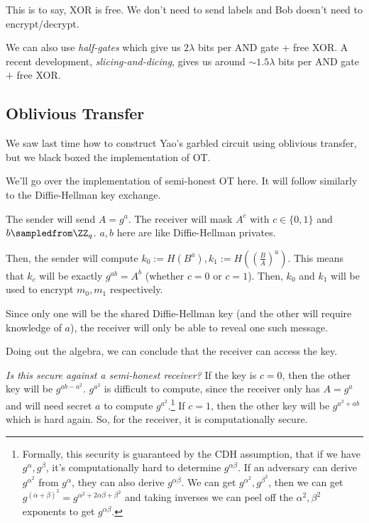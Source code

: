 This is to say, \textsf{XOR} is free. We don't need to send labels and Bob doesn't need to encrypt/decrypt.


We can also use \emph{half-gates} which give us $2\lambda$ bits per \textsf{AND} gate + free \textsf{XOR}. A recent development, \emph{slicing-and-dicing}, gives us around $\sim 1.5\lambda$ bits per \textsf{AND} gate + free \textsf{XOR}.

\subsection{Oblivious Transfer}
We saw last time how to construct Yao's garbled circuit using oblivious transfer, but we black boxed the implementation of OT.

We'll go over the implementation of semi-honest OT here. It will follow similarly to the Diffie-Hellman key exchange.


The sender will send $A = g^a$. The receiver will mask $A^c$ with $c\in \{0,1\}$ and $b\sampledfrom \ZZ_q$. $a,b$ here are like Diffie-Hellman privates.

Then, the sender will compute $k_0 := H(B^a), k_1 := H\left( \left( \frac{B}{A} \right)^a \right)$. This means that $k_c$ will be exactly $g^{ab} = A^b$ (whether $c = 0$ or $c = 1$). Then, $k_0$ and $k_1$ will be used to encrypt $m_0, m_1$ respectively.

Since only one will be the shared Diffie-Hellman key (and the other will require knowledge of $a$), the receiver will only be able to reveal one such message.

Doing out the algebra, we can conclude that the receiver can access the key.


\emph{Is this secure against a semi-honest receiver?} If the key is $c = 0$, then the other key will be $g^{ab-a^2}$. $g^{a^2}$ is difficult to compute, since the receiver only has $A = g^a$ and will need secret $a$ to compute $g^{a^2}$.\footnote{Formally, this security is guaranteed by the CDH assumption, that if we have $g^{\alpha}, g^{\beta}$, it's computationally hard to determine $g^{\alpha\beta}$. If an adversary can derive $g^{\alpha^2}$ from $g^{\alpha}$, they can also derive $g^{\alpha\beta}$. We can get $g^{\alpha^2}, g^{\beta^2}$, then we can get $g^{(\alpha+\beta)^2}=g^{\alpha^2 + 2\alpha\beta + \beta^2}$ and taking inverses we can peel off the $\alpha^2,\beta^2$ exponents to get $g^{\alpha\beta}$.} If $c = 1$, then the other key will be $g^{a^2 + ab}$ which is hard again. So, for the receiver, it is computationally secure.

